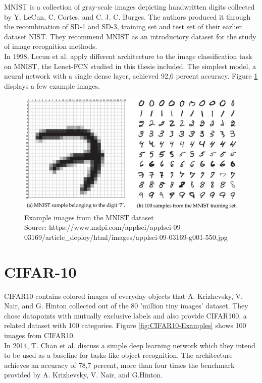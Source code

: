 MNIST is a collection of gray-scale images depicting handwritten digits collected by Y. LeCun, C. Cortes, and C. J. C. Burges. The authors produced it through the recombination of SD-1 and SD-3, training set and test set of their earlier dataset NIST. They recommend MNIST as an introductory dataset for the study of image recognition methods\cite{MNIST}.\\
In 1998, Lecun et al. apply different architecture to the image classification task on MNIST, the Lenet-FCN studied in this thesis included. The simplest model, a neural network with a single dense layer, achieved 92,6 percent accuracy.\cite{lecun1998gradient}
Figure \ref{fig:MNIST-Examples} displays a few example images.
\begin{figure}
	\centering
	\includegraphics[width=450px]{gfx/6-Datasets/MNIST_examples.jpg}
	\caption{
		Example images from the MNIST dataset\\
		Source: https://www.mdpi.com/applsci/applsci-09-03169/article\_deploy/html/images/applsci-09-03169-g001-550.jpg
	}
	\label{fig:MNIST-Examples}
\end{figure}

\section{CIFAR-10}
CIFAR10 contains colored images of everyday objects that A. Krizhevsky, V. Nair, and G. Hinton collected out of the 80 'million tiny images' dataset. They chose datapoints with mutually exclusive labels and also provide CIFAR100, a related dataset with 100 categories. Figure \ref{fig:CIFAR10-Examples} shows 100 images from CIFAR10. \cite{CIFAR}\\
In 2014, T. Chan et al. discuss a simple deep learning network which they intend to be used as a baseline for tasks like object recognition. The architecture achieves an accuracy of 78,7 percent, more than four times the benchmark provided by A. Krizhevsky, V. Nair, and G.Hinton.\cite{CIFAR-Baseline}

